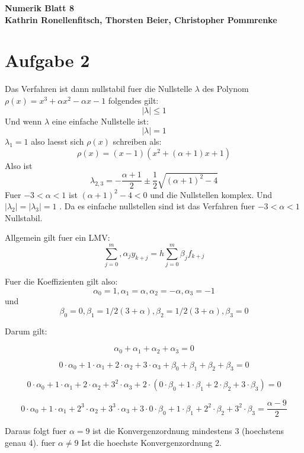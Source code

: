 \documentclass[10pt,oneside,a4paper]{scrartcl}
\begin{document}
    \begin{center}
        \huge %
        \bfseries %
        \sffamily %
        Numerik Blatt 8\\[1em]
        \normalsize
        Kathrin Ronellenfitsch, Thorsten Beier, Christopher Pommrenke
    \end{center}
    
\section*{Aufgabe 2}
Das Verfahren  ist dann nullstabil fuer die Nullstelle $\lambda$  des Polynom
$ \rho(x)= x^3 + \alpha x^2 - \alpha x -1$ folgendes gilt:
\[  | \lambda | \leq 1 \]
Und wenn $\lambda$  eine einfache Nullstelle ist:
\[  | \lambda | = 1 \]
$\lambda_1=1$ also laesst sich  $ \rho(x)$ schreiben als:
\[  \rho (x)= (x-1)(x^2+(\alpha +1)x+1) \]
Also ist 
\[   \lambda_{2,3}  = - \frac{\alpha+1}{2} \pm \frac{1}{2} 
\sqrt{(\alpha +1)^2 -4}  \]
Fuer $-3< \alpha < 1 $   ist $(\alpha +1)^2 -4 <0 $ und die Nullstellen komplex.
Und $|\lambda_2|=|\lambda_3|=1$ . Da es einfache nullstellen sind ist das Verfahren fuer
$-3< \alpha < 1 $  Nullstabil. 

Allgemein gilt fuer ein LMV:
\[
\sum_{j=0}^m ,\alpha_j y_{k+j}=h \sum_{j=0}^m \beta_j f_{k+j}
\]

Fuer die Koeffizienten gilt also:
\[ \alpha_0=1 , \alpha_1=\alpha , \alpha_2=-\alpha ,\alpha_3=-1 \]
und
\[ \beta_0=0 , \beta_1=1/2 (3+\alpha) , \beta_2=1/2 (3+\alpha),\beta_3=0 \]

Darum gilt:

\[  \alpha_0 + \alpha_1 + \alpha_2 + \alpha_3 = 0 \]

\[ 0 \cdot \alpha_0 + 1 \cdot \alpha_1 + 2 \cdot \alpha_2 + 3 \cdot \alpha_3 + \beta_0 + \beta_1 + \beta_2 + \beta_3 = 0 \]

\[ 0 \cdot \alpha_0 + 1 \cdot \alpha_1 + 2 \cdot \alpha_2 + 3^2 \cdot \alpha_3 + 2 \cdot (0 \cdot \beta_0 + 1 \cdot \beta_1 + 2 \cdot \beta_2 + 3 \cdot \beta_3 ) = 0 \]

\[ 0 \cdot \alpha_0 + 1 \cdot \alpha_1 + 2^3 \cdot \alpha_2 + 3^3 \cdot \alpha_3 + 3 \cdot 0 \cdot \beta_0 + 1 \cdot \beta_1 + 2^2 \cdot \beta_2 + 3^2 \cdot \beta_3 =  \frac{\alpha-9}{2} \]

Daraus folgt  fuer $\alpha=9$ ist die Konvergenzordnung mindestens 3 (hoechstens genau 4). fuer $\alpha \not = 9$
Ist die hoechste Konvergenzordnung 2.
\end{document}

